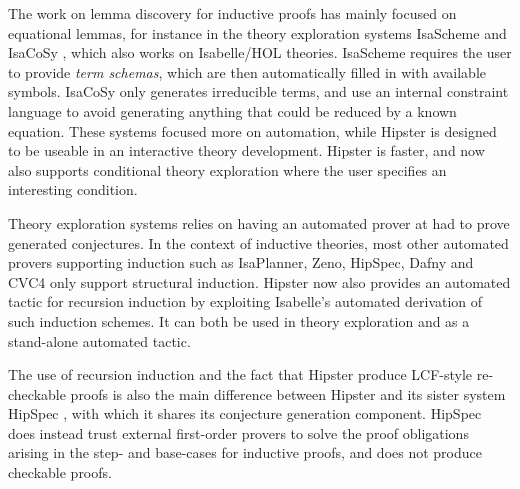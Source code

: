 \label{sec:related}

The work on lemma discovery for inductive proofs has mainly focused on equational lemmas, for instance in the theory exploration systems IsaScheme and IsaCoSy \cite{isascheme,isacosy}, which also works on Isabelle/HOL theories. IsaScheme requires the user to provide \emph{term schemas}, which are then automatically filled in with available symbols. IsaCoSy only generates irreducible terms, and use an internal constraint language to avoid generating anything that could be reduced by a known equation. These systems focused more on automation, while Hipster is designed to be useable in an interactive theory development. Hipster is faster, and now also supports conditional theory exploration where the user specifies an interesting condition. 

Theory exploration systems relies on having an automated prover at had to prove generated conjectures. In the context of inductive theories, most other automated provers supporting induction such as IsaPlanner, Zeno, HipSpec, Dafny and CVC4 \cite{isaplanner, zeno, hipspecCADE,dafny,cvc4} only support structural induction. Hipster now also provides an automated tactic for recursion induction by exploiting Isabelle's automated derivation of such induction schemes. It can both be used in theory exploration and as a stand-alone automated tactic. 

The use of recursion induction and the fact that Hipster produce LCF-style re-checkable proofs is also the main difference between Hipster and its sister system HipSpec \cite{hipspecCADE}, with which it shares its conjecture generation component. HipSpec does instead trust external first-order provers to solve the proof obligations arising in the step- and base-cases for inductive proofs, and does not produce checkable proofs. 